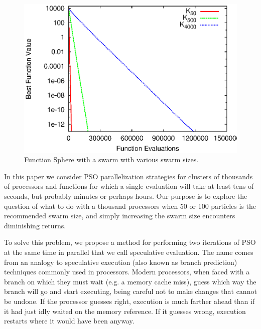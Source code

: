 \documentclass[journal,letterpaper]{IEEEtran}
\begin{document}
\begin{figure}
  \centering
  \includegraphics[width=.8\columnwidth]{evals_sphere}
  \caption{Function Sphere with a swarm with various swarm sizes.}
  \label{fig:evals-sphere}
\end{figure}

In this paper we consider PSO parallelization strategies for clusters of
thousands of processors and functions for which a single evaluation will take
at least tens of seconds, but probably minutes or perhaps hours.  Our purpose
is to explore the question of what to do with a thousand processors when 50 or
100 particles is the recommended swarm size, and simply increasing the swarm
size encounters diminishing returns.

To solve this problem, we propose a method for performing two iterations of PSO
at the same time in parallel that we call speculative evaluation.  The name
comes from an analogy to speculative execution (also known as branch
prediction) techniques commonly used in processors.  Modern processors, when
faced with a branch on which they must wait (e.g. a memory cache miss), guess
which way the branch will go and start executing, being careful not to make
changes that cannot be undone.  If the processor guesses right, execution is
much farther ahead than if it had just idly waited on the memory reference.  If
it guesses wrong, execution restarts where it would have been anyway.  
\end{document}
